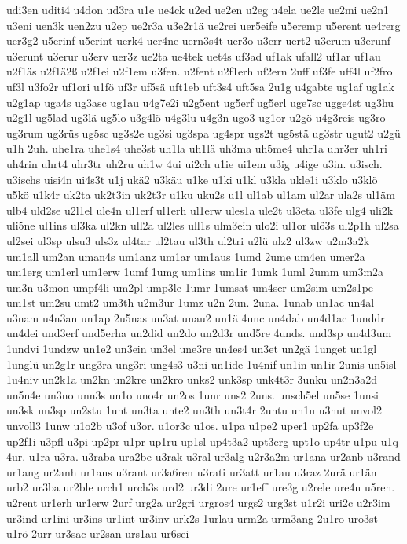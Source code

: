 {udi3en
uditi4
u4don
ud3ra
u1e
ue4ck
u2ed
ue2en
u2eg
u4ela
ue2le
ue2mi
ue2n1
u3eni
uen3k
uen2zu
u2ep
ue2r3a
u3e2r1ä
ue2rei
uer5eife
u5eremp
u5erent
ue4rerg
uer3g2
u5erinf
u5erint
uerk4
uer4ne
uern3s4t
uer3o
u3err
uert2
u3erum
u3erunf
u3erunt
u3erur
u3erv
uer3z
ue2ta
ue4tek
uet4s
uf3ad
uf1ak
ufall2
uf1ar
uf1au
u2f1äs
u2f1ä2ß
u2f1ei
u2f1em
u3fen.
u2fent
u2f1erh
uf2ern
2uff
uf3fe
uff4l
uf2fro
uf3l
u3fo2r
uf1ori
u1fö
uf3r
uf5sä
uft1eb
uft3s4
uft5sa
2u1g
u4gabte
ug1af
ug1ak
u2g1ap
uga4s
ug3asc
ug1au
u4g7e2i
u2g5ent
ug5erf
ug5erl
uge7sc
ugge4st
ug3hu
u2g1l
ug5lad
ug3lä
ug5lo
u3g4lö
u4g3lu
u4g3n
ugo3
ug1or
u2gö
u4g3reis
ug3ro
ug3rum
ug3rüs
ug5sc
ug3s2e
ug3si
ug3spa
ug4spr
ugs2t
ug5stä
ug3str
ugut2
u2gü
u1h
2uh.
uhe1ra
uhe1s4
uhe3st
uh1la
uh1lä
uh3ma
uh5me4
uhr1a
uhr3er
uh1ri
uh4rin
uhrt4
uhr3tr
uh2ru
uh1w
4ui
ui2ch
u1ie
ui1em
u3ig
u4ige
u3in.
u3isch.
u3ischs
uisi4n
ui4s3t
u1j
ukä2
u3käu
u1ke
u1ki
u1kl
u3kla
ukle1i
u3klo
u3klö
u5kö
u1k4r
uk2ta
uk2t3in
uk2t3r
u1ku
uku2s
u1l
ul1ab
ul1am
ul2ar
ula2s
ul1äm
ulb4
uld2se
u2l1el
ule4n
ul1erf
ul1erh
ul1erw
ules1a
ule2t
ul3eta
ul3fe
ulg4
uli2k
uli5ne
ul1ins
ul3ka
ul2kn
ull2a
ul2les
ull1s
ulm3ein
ulo2i
ul1or
ulö3s
ul2p1h
ul2sa
ul2sei
ul3sp
ulsu3
uls3z
ul4tar
ul2tau
ul3th
ul2tri
u2lü
ulz2
ul3zw
u2m3a2k
um1all
um2an
uman4s
um1anz
um1ar
um1aus
1umd
2ume
um4en
umer2a
um1erg
um1erl
um1erw
1umf
1umg
um1ins
um1ir
1umk
1uml
2umm
um3m2a
um3n
u3mon
umpf4li
um2pl
ump3le
1umr
1umsat
um4ser
um2sim
um2s1pe
um1st
um2su
umt2
um3th
u2m3ur
1umz
u2n
2un.
2una.
1unab
un1ac
un4al
u3nam
u4n3an
un1ap
2u5nas
un3at
unau2
un1ä
4unc
un4dab
un4d1ac
1unddr
un4dei
und3erf
und5erha
un2did
un2do
un2d3r
und5re
4unds.
und3sp
un4d3um
1undvi
1undzw
un1e2
un3ein
un3el
une3re
un4es4
un3et
un2gä
1unget
un1gl
1unglü
un2g1r
ung3ra
ung3ri
ung4s3
u3ni
un1ide
1u4nif
un1in
un1ir
2unis
un5isl
1u4niv
un2k1a
un2kn
un2kre
un2kro
unks2
unk3sp
unk4t3r
3unku
un2n3a2d
un5n4e
un3no
unn3s
un1o
uno4r
un2os
1unr
uns2
2uns.
unsch5el
un5se
1unsi
un3sk
un3sp
un2stu
1unt
un3ta
unte2
un3th
un3t4r
2untu
un1u
u3nut
unvol2
unvoll3
1unw
u1o2b
u3of
u3or.
u1or3c
u1os.
u1pa
u1pe2
uper1
up2fa
up3f2e
up2f1i
u3pfl
u3pi
up2pr
u1pr
up1ru
up1sl
up4t3a2
upt3erg
upt1o
up4tr
u1pu
u1q
4ur.
u1ra
u3ra.
u3raba
ura2be
u3rak
u3ral
ur3alg
u2r3a2m
ur1ana
ur2anb
u3rand
ur1ang
ur2anh
ur1ans
u3rant
ur3a6ren
u3rati
ur3att
ur1au
u3raz
2urä
ur1än
urb2
ur3ba
ur2ble
urch1
urch3s
urd2
ur3di
2ure
ur1eff
ure3g
u2rele
ure4n
u5ren.
u2rent
ur1erh
ur1erw
2urf
urg2a
ur2gri
urgros4
urgs2
urg3st
u1r2i
uri2c
u2r3im
ur3ind
ur1ini
ur3ins
ur1int
ur3inv
urk2s
1urlau
urm2a
urm3ang
2u1ro
uro3st
u1rö
2urr
ur3sac
ur2san
urs1au
ur6sei
}
